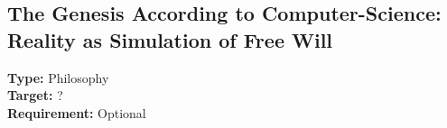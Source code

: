 %
%
%
%

\subsection{The Genesis According to Computer-Science: Reality as Simulation of Free Will}
\textbf{Type:} Philosophy \\
\textbf{Target:} ? \\
\textbf{Requirement:} Optional \\


